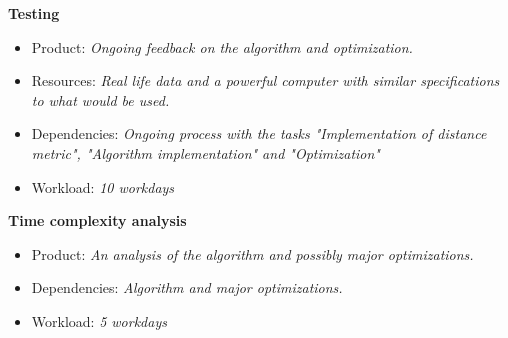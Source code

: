 \documentclass[12pt,a4paper]{article}
\begin{document}
\noindent
\textbf{Testing}
\begin{itemize}
\item Product: \textit{Ongoing feedback on the algorithm and optimization.}
\item Resources: \textit{Real life data and a powerful computer with similar specifications to what would be used.}
\item Dependencies: \textit{Ongoing process with the tasks "Implementation of distance metric", "Algorithm implementation" and "Optimization"}
\item Workload: \textit{10 workdays}
\end{itemize}

\noindent
\textbf{Time complexity analysis}
\begin{itemize}
\item Product: \textit{An analysis of the algorithm and possibly major optimizations.}
\item Dependencies: \textit{Algorithm and major optimizations.}
\item Workload: \textit{5 workdays}
\end{itemize}
\end{document}
